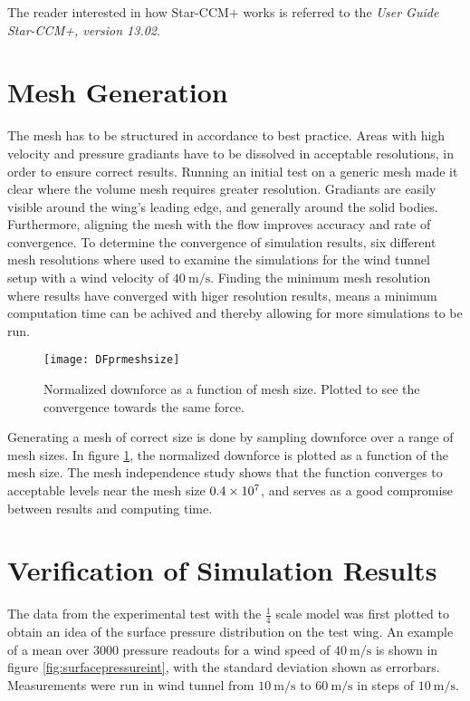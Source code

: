  The reader interested in how Star-CCM+ works is referred to the \emph{User Guide Star-CCM+, version 13.02}.

\section{Mesh Generation}
\label{sec:mesh}
  The mesh has to be structured in accordance to best practice. Areas with high velocity and pressure gradiants have to be dissolved in acceptable resolutions, in order to ensure correct results. Running an initial test on a generic mesh made it clear where the volume mesh requires greater resolution. Gradiants are easily visible around the wing's leading edge, and generally around the solid bodies. Furthermore, aligning the mesh with the flow improves accuracy and rate of convergence. To determine the convergence of simulation results, six different mesh resolutions where used to examine the simulations for the wind tunnel setup with a wind velocity of $\SI{40}{\metre\per\second}$. Finding the minimum mesh resolution where results have converged with higer resolution results, means a minimum computation time can be achived and thereby allowing for more simulations to be run.

  \begin{figure}
    \texttt{[image: DFprmeshsize]}
    \caption{Normalized downforce as a function of mesh size. Plotted to see the convergence towards the same force.}
    \label{fig:DFprmeshsize}
  \end{figure}

  Generating a mesh of correct size is done by sampling downforce over a range of mesh sizes. In figure \ref{fig:DFprmeshsize}, the normalized downforce is plotted as a function of the mesh size. The mesh independence study shows that the function converges to acceptable levels near the mesh size $\SI{.4E7}{}$, and serves as a good compromise between results and computing time.

  \section{Verification of Simulation Results}
  \label{sec:simulationcomparison}

  The data from the experimental test with the $\frac{1}{4}$ scale model was first plotted to obtain an idea of the surface pressure distribution on the test wing. An example of a mean over 3000 pressure readouts for a wind speed of $\SI{40}{\metre\per\second}$ is shown in figure \ref{fig:surfacepressureint}, with the standard deviation shown as errorbars. Measurements were run in wind tunnel from $\SI{10}{\metre\per\second}$ to $\SI{60}{\metre\per\second}$ in steps of $\SI{10}{\metre\per\second}$.

